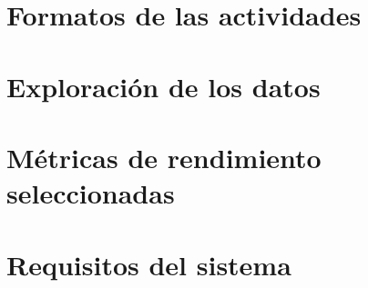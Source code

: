 \section{Formatos de las actividades}
\label{sec:formatos}

\section{Exploración de los datos}
\label{sec:exploracion}

\section{Métricas de rendimiento seleccionadas}
\label{sec:metricas_seleccionadas}

\section{Requisitos del sistema}
\label{sec:requisitos}
